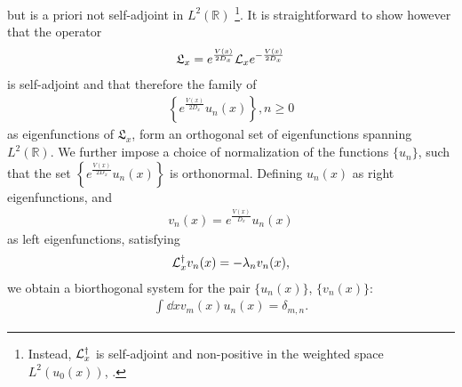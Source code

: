 \documentclass[%
 reprint,
superscriptaddress,
nofootinbib,
 amsmath,amssymb,
 aps,
prx,
]{revtex4-2}
\begin{document}
but is a priori not self-adjoint in $L^2(\mathbb{R})$ \footnote{Instead, $\mathcal{L}_x^{\dagger}$  is self-adjoint and non-positive in the weighted  space $L^2(u_0(x))$, \cite{pavliotis2014}.}. It is straightforward to show \cite{risken_fokker-planck_1984} however that the  operator
\begin{align}
	\mathfrak{L}_x=e^{ \frac{V(x)}{2 D_x}} \mathcal{L}_x e^{ - \frac{V(x)}{2 D_x} }
	\label{}
\end{align}
is self-adjoint and that therefore the family of
\begin{align}
	\left \lbrace e^{ \frac{V(x)}{2D_x}} u_n(x) \right \rbrace, n\geq 0
	\label{}
\end{align}
as eigenfunctions of $\mathfrak{L}_x$, form an orthogonal set of eigenfunctions spanning $L^2(\mathbb{R})$. We further impose a choice of normalization of the functions $\{u_n\}$, such that the set $\left \lbrace e^{\frac{V(x)}{2D_x}} u_n(x) \right \rbrace$ is orthonormal.
Defining $u_n(x)$ as right eigenfunctions, and 
\begin{align}
	v_n(x) = e^{\frac{V(x)}{D_x}} u_n(x)
	\label{eq:def_v_n}
\end{align}
as left eigenfunctions, satisfying
\begin{align}
	\mathcal{L}_x^{\dagger} v_n(x) = -\lambda_n v_n(x),
	\label{}
\end{align}
we obtain a biorthogonal system for the pair $\{u_n(x)\}$, $\{v_n(x)\}$:
\begin{align}
	\int_{}^{} \dd x v_m(x) u_n(x) = \delta_{m,n}.
	\label{eq:orthogonality_condition}
\end{align}
\end{document}
